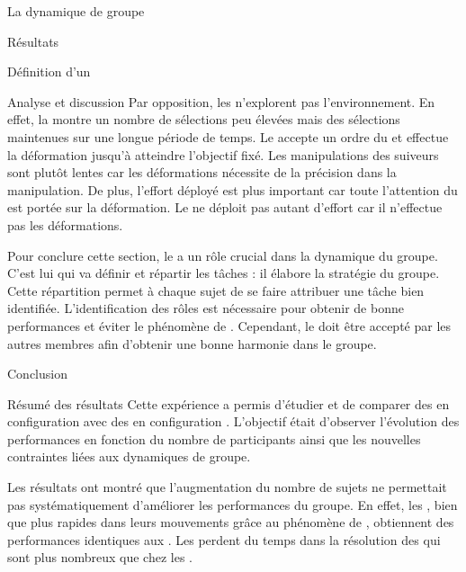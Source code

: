 \documentclass[myfrancais,ngerman,english,frenchb]{mythesis}
\begin{document}
\begin{mychapter}{La dynamique de groupe}
\begin{mysection}{Résultats}
\begin{mysubsection}{Définition d'un }
\begin{mysubsubsection}{Analyse et discussion}
					Par opposition, les  n'explorent pas l'environnement.
					En effet, la  montre un nombre de sélections peu élevées mais des sélections maintenues sur une longue période de temps.
					Le  accepte un ordre du  et effectue la déformation jusqu'à atteindre l'objectif fixé.
					Les manipulations des suiveurs sont plutôt lentes car les déformations nécessite de la précision dans la manipulation.
					De plus, l'effort déployé est plus important car toute l'attention du  est portée sur la déformation.
					Le  ne déploit pas autant d'effort car il n'effectue pas les déformations.

					Pour conclure cette section, le  a un rôle crucial dans la dynamique du groupe.
					C'est lui qui va définir et répartir les tâches : il élabore la stratégie du groupe.
					Cette répartition permet à chaque sujet de se faire attribuer une tâche bien identifiée.
					L'identification des rôles est nécessaire pour obtenir de bonne performances et éviter le phénomène de  .
					Cependant, le  doit être accepté par les autres membres afin d'obtenir une bonne harmonie dans le groupe.
				\end{mysubsubsection}
			\end{mysubsection}
		\end{mysection}
		\begin{mysection}{Conclusion}
			\begin{mysubsection}{Résumé des résultats}
				Cette expérience a permis d'étudier et de comparer des  en configuration  avec des  en configuration .
				L'objectif était d'observer l'évolution des performances en fonction du nombre de participants ainsi que les nouvelles contraintes liées aux dynamiques de groupe.

				Les résultats ont montré que l'augmentation du nombre de sujets ne permettait pas systématiquement d'améliorer les performances du groupe.
				En effet, les , bien que plus rapides dans leurs mouvements grâce au phénomène de , obtiennent des performances identiques aux .
				Les  perdent du temps dans la résolution des  qui sont plus nombreux que chez les .


\end{mysubsection}
\end{mysection}
\end{mychapter}
\end{document}
